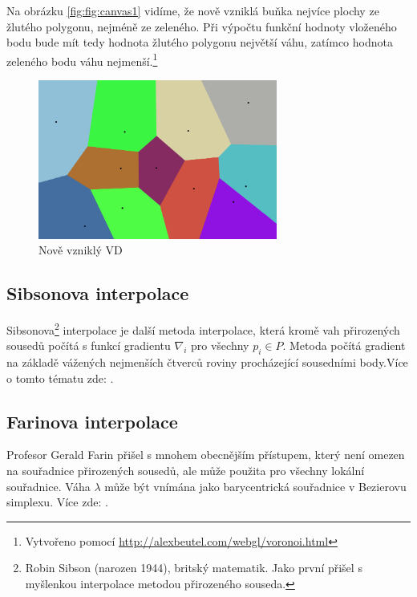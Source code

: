 \documentclass[12pt,a4paper]{article}
\begin{document}
Na obrázku \ref{fig:fig:canvas1} vidíme, že nově vzniklá buňka  nejvíce plochy ze žlutého polygonu, nejméně ze zeleného. Při výpočtu funkční hodnoty vloženého bodu bude mít tedy hodnota žlutého polygonu největší váhu, zatímco hodnota zeleného bodu váhu nejmenší.\footnote{Vytvořeno pomocí \url{http://alexbeutel.com/webgl/voronoi.html}}
\begin{figure}[h!]
\centering
\includegraphics[width=0.7\textwidth]{img/canvas_2.png}
\caption{Nově vzniklý VD}
\label{fig:fig:canvas2}
\end{figure}

\newpage
\subsection{Sibsonova interpolace}
\label{sub:Sibson}
Sibsonova\footnote{Robin Sibson (narozen 1944), britský matematik. Jako první přišel s myšlenkou interpolace metodou přirozeného souseda.} interpolace je další metoda interpolace, která kromě vah přirozených sousedů počítá s funkcí gradientu $\nabla_i$ pro všechny $p_i \in P$. Metoda počítá gradient na základě vážených nejmenších čtverců roviny procházející sousedními body.Více o tomto tématu zde: \cite{Bobach} \cite{CGAL}.

\subsection{Farinova interpolace}
\label{sub:Farin}
Profesor Gerald Farin přišel s mnohem obecnějším přístupem, který není omezen na souřadnice přirozených sousedů, ale může použita pro všechny lokální souřadnice. Váha $\lambda$ může být vnímána jako barycentrická souřadnice v Bezierovu simplexu. Více zde: \cite{Bobach} \cite{CGAL}.
\end{document}
